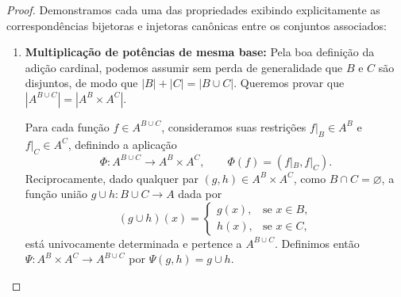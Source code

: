 \begin{proof}
    Demonstramos cada uma das propriedades exibindo explicitamente as correspondências bijetoras e injetoras canônicas entre os conjuntos associados:
    \begin{enumerate}
        \item \textbf{Multiplicação de potências de mesma base:} Pela boa definição da adição cardinal, podemos assumir sem perda de generalidade que \(B\) e \(C\) são disjuntos, de modo que \(|B| + |C| = |B \cup C|\). Queremos provar que \(|A^{B \cup C}| = |A^B \times A^C|\).

              Para cada função \(f \in A^{B \cup C}\), consideramos suas restrições \(f|_B \in A^B\) e \(f|_C \in A^C\), definindo a aplicação
              \[
                  \Phi: A^{B \cup C} \to A^B \times A^C, \qquad \Phi(f) = (f|_B, f|_C).
              \]
              Reciprocamente, dado qualquer par \((g, h) \in A^B \times A^C\), como \(B \cap C = \varnothing\), a função união \(g \cup h: B \cup C \to A\) dada por
              \[
                  (g \cup h)(x) =
                  \begin{cases}
                      g(x), & \text{se } x \in B, \\
                      h(x), & \text{se } x \in C,
                  \end{cases}
              \]
              está univocamente determinada e pertence a \(A^{B \cup C}\). Definimos então \(\Psi: A^B \times A^C \to A^{B \cup C}\) por \(\Psi(g, h) = g \cup h\).


\end{enumerate}
\end{proof}
